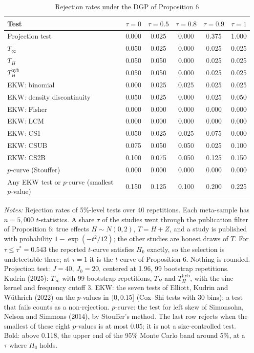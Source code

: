\begin{table}[htbp]
\centering
\caption{Rejection rates under the DGP of Proposition 6}
\label{tab:prop6_power_n5000}
\footnotesize
\setlength{\tabcolsep}{4pt}
\begin{tabular}{lccccc}
\toprule
Test & $\tau = 0$ & $\tau = 0.5$ & $\tau = 0.8$ & $\tau = 0.9$ & $\tau = 1$ \\
\midrule
Projection test & 0.000 & 0.025 & 0.000 & 0.375 & 1.000 \\
\midrule
$T_\infty$ & 0.050 & 0.025 & 0.000 & 0.025 & 0.025 \\
$T_H$ & 0.050 & 0.050 & 0.000 & 0.025 & 0.025 \\
$T_H^{\mathrm{hyb}}$ & 0.050 & 0.050 & 0.000 & 0.025 & 0.025 \\
\midrule
EKW: binomial & 0.000 & 0.025 & 0.025 & 0.025 & 0.025 \\
EKW: density discontinuity & 0.050 & 0.025 & 0.000 & 0.025 & 0.050 \\
EKW: Fisher & 0.000 & 0.000 & 0.000 & 0.000 & 0.000 \\
EKW: LCM & 0.000 & 0.000 & 0.000 & 0.000 & 0.000 \\
EKW: CS1 & 0.050 & 0.025 & 0.025 & 0.075 & 0.000 \\
EKW: CSUB & 0.075 & 0.050 & 0.050 & 0.025 & 0.100 \\
EKW: CS2B & 0.100 & 0.075 & 0.050 & 0.125 & 0.150 \\
$p$-curve (Stouffer) & 0.000 & 0.000 & 0.000 & 0.000 & 0.000 \\
\midrule
Any EKW test or $p$-curve (smallest $p$-value) & 0.150 & 0.125 & 0.100 & 0.200 & 0.225 \\
\bottomrule
\end{tabular}
\par\smallskip
\begin{minipage}{\linewidth}\footnotesize\textit{Notes:} Rejection rates of 5\%-level tests over 40 repetitions. Each meta-sample has $n = 5{,}000$ $t$-statistics. A share $\tau$ of the studies went through the publication filter of Proposition 6: true effects $H \sim N(0, 2)$, $T = H + Z$, and a study is published with probability $1 - \exp(-t^2/12)$; the other studies are honest draws of $T$. For $\tau \le \tau^* = 0.543$ the reported $t$-curve satisfies $H_0$ exactly, so the selection is undetectable there; at $\tau = 1$ it is the $t$-curve of Proposition 6. Nothing is rounded. Projection test: $J = 40$, $J_0 = 20$, centered at 1.96, 99 bootstrap repetitions. Kudrin (2025): $T_\infty$ with 99 bootstrap repetitions, $T_H$ and $T_H^{\mathrm{hyb}}$, with the sinc kernel and frequency cutoff 3. EKW: the seven tests of Elliott, Kudrin and W\"uthrich (2022) on the $p$-values in $(0, 0.15]$ (Cox--Shi tests with 30 bins); a test that fails counts as a non-rejection. $p$-curve: the test for left skew of Simonsohn, Nelson and Simmons (2014), by Stouffer's method. The last row rejects when the smallest of these eight $p$-values is at most 0.05; it is not a size-controlled test. Bold: above 0.118, the upper end of the 95\% Monte Carlo band around 5\%, at a $\tau$ where $H_0$ holds.\end{minipage}
\end{table}
